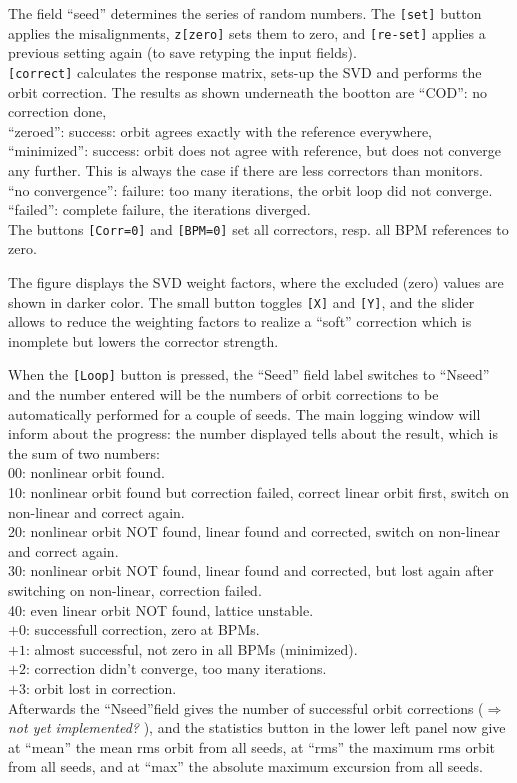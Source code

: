 \documentclass[12pt]{article}
\newcommand\todo[1]{$\Longrightarrow$ {\em #1} }
\begin{document}
The field ``seed'' determines the series of random numbers. 
The {\tt [set]} button applies the misalignments, {\tt z[zero]} sets them to zero,
and {\tt [re-set]} applies a previous setting again (to save retyping the input fields).\\

{\tt [correct]} calculates the response matrix, sets-up the SVD and performs the orbit correction. The results as shown underneath the bootton are
``COD'': no correction done, \\
``zeroed'': success: orbit agrees exactly with the reference everywhere,\\
``minimized'': success: orbit does not agree with reference, but does not converge any further. This is always the case if there are less correctors than monitors.\\
``no convergence'': failure: too many iterations, the orbit loop did not converge.\\
``failed'': complete failure, the iterations diverged.\\
The buttons {\tt [Corr=0]} and {\tt [BPM=0]} set all correctors, resp. all BPM references to zero.


The figure displays the SVD weight factors, where the excluded (zero) values are shown in darker color. The small button toggles {\tt [X]} and {\tt [Y]}, and the slider allows to reduce the weighting factors to realize a ``soft'' correction which is inomplete but lowers the corrector strength.


When the  {\tt [Loop]} button is pressed, the ``Seed'' field label switches to ``Nseed'' and the number entered will be the numbers of orbit corrections to be automatically performed for a couple of seeds.
The main logging window will inform about the progress: the number displayed tells about the result, which is the sum of two numbers:\\
00: nonlinear orbit found.\\
10: nonlinear orbit found but correction failed, correct linear orbit first, switch on non-linear and correct again.\\
20: nonlinear orbit NOT found, linear found and corrected, switch on non-linear and correct again.\\
30: nonlinear orbit NOT found, linear found and corrected, but lost again after switching on non-linear, correction failed.\\
40: even linear orbit NOT found, lattice unstable.\\
$+0$: successfull correction, zero at BPMs.\\
$+1$: almost successful, not zero in all BPMs (minimized).\\
$+2$: correction didn't converge, too many iterations.\\
$+3$: orbit lost in correction.\\
Afterwards the ``Nseed''field gives the number of successful orbit corrections (\todo{not yet implemented?}), and the statistics button in the lower left panel now give at ``mean'' the mean rms orbit from all seeds, at ``rms'' the maximum rms orbit from all seeds, and at ``max'' the absolute maximum excursion from all seeds.\\
\end{document}
